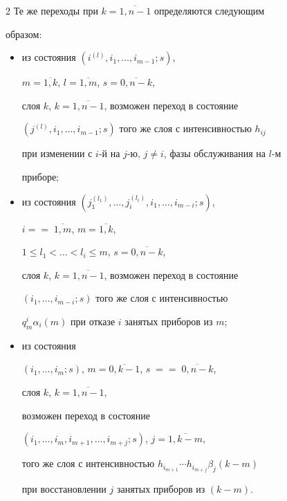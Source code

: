 \begin{multicols}{2}
Те же переходы при $k=\overline{1,n-1}$ определяются следующим


образом:


\begin{itemize}


\item из состояния $\left (i^{(l)},i_1,\ldots,i_{m-1};s\right )$,


$m=\overline{1,k}$, $l=\overline{1,m}$, $s=\overline{0,n-k}$,


слоя $k$, $k=\overline{1,n-1}$, возможен переход в состояние


$\left (j^{(l)},i_1,\ldots,i_{m-1};s\right )$ того же слоя с интенсивностью $h_{ij}$


при изменении с $i$-й на $j$-ю, $j\ne i$, фазы обслуживания на $l$-м


приборе;


\item


из состояния $\left (j_1^{(l_1)},\ldots,j_i^{(l_i)},i_1,\ldots,i_{m-i};s\right )$,


$i=$\linebreak $=\;\overline{1,m}$, $m=\overline{1,k}$,


$1\le l_1<\ldots<l_i\le m$, $s=\overline{0,n-k}$,


слоя $k$, $k=\overline{1,n-1}$, возможен переход в состояние


$(i_1,\ldots,i_{m-i};s)$ того же слоя с интенсивностью


$q^i_m\alpha_i(m)$ при отказе $i$ занятых приборов из $m$;


\item


из состояния


$(i_1,\ldots, i_m;s)$, $m=\overline{0,k-1}$, $s\;=$\linebreak $=\;\overline{0,n-k}$,


слоя $k$, $k=\overline{1,n-1}$,


возможен переход в состояние


$(i_1,\ldots,i_{m},i_{m+1},\ldots,i_{m+j};s)$, $j=\overline{1,k-m}$,


того же слоя с интенсивностью $h_{i_{m+1}}\cdots h_{i_{m+j}}\beta_j(k-m)$


при восстановлении $j$ занятых приборов из $(k-m)$.


\end{itemize}





\end{multicols}
